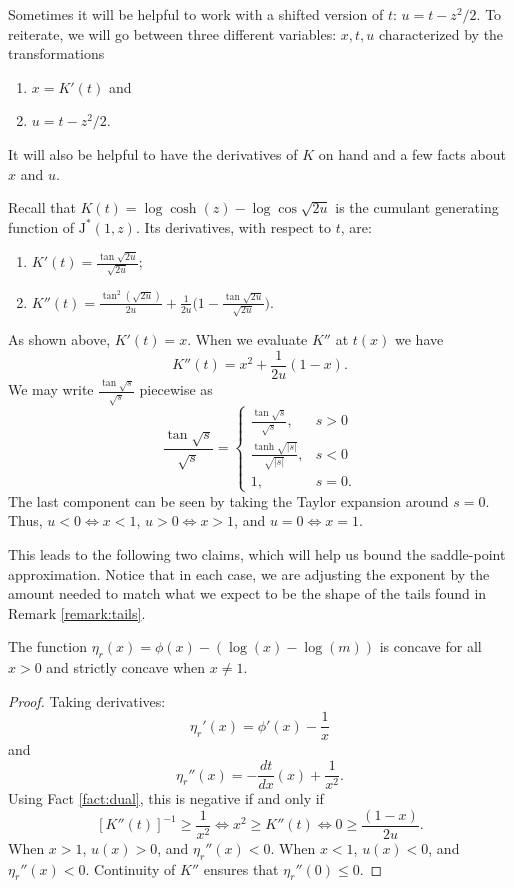 \documentclass[12pt]{article}
\newcommand{\JJ}{\text{J}^*}
\newcommand{\utanh}[1]{\frac{\tanh{\sqrt{#1}}}{\sqrt{#1}}}
\newcommand{\utan}[1]{\frac{\tan{\sqrt{#1}}}{\sqrt{#1}}}
\newcommand{\dd}[2]{\frac{d #1}{d #2}}
\begin{document}
Sometimes it will be helpful to work with a shifted version of $t$: \( u = t -
z^2/2.  \) To reiterate, we will go between three different variables: $x, t, u$
characterized by the transformations
\begin{enumerate}
\item $x = K'(t)$ and
\item $u = t - z^2 / 2$.
\end{enumerate}
It will also be helpful to have the derivatives of $K$ on hand and a few facts
about $x$ and $u$.
\begin{fact}
\label{fact:cgf-derivatives}
Recall that $K(t) = \log \cosh(z) - \log \cos \sqrt{2u}$ is the cumulant
generating function of $\JJ(1,z)$.  Its derivatives, with respect to $t$, are:
\begin{enumerate}
\item $\displaystyle K'(t) = \utan{2u}$;
\item $\displaystyle K''(t) = \frac{\tan^2(\sqrt{2u})}{2u} + \frac{1}{2u} \Big(1
  - \utan{2u} \Big)$.
\end{enumerate}
As shown above, $K'(t) = x$.  When we evaluate $K''$ at $t(x)$ we have
\[
K''(t) = x^2 + \frac{1}{2u} (1 - x).
\]
We may write $\utan{s}$ piecewise as
\[
\utan{s} = 
\begin{cases}
\utan{s}, & s > 0 \\
\utanh{|s|},  & s < 0 \\
1, & s = 0.
\end{cases}
\]
The last component can be seen by taking the Taylor expansion around $s=0$.
Thus, $u < 0 \iff x < 1$, $u> 0 \iff x > 1$, and $u=0 \iff x = 1$.
\end{fact}

This leads to the following two claims, which will help us bound the
saddle-point approximation.  Notice that in each case, we are adjusting the
exponent by the amount needed to match what we expect to be the shape of the
tails found in Remark \ref{remark:tails}.

\begin{lemma}
  The function $\eta_r(x) = \phi(x) - (\log(x) - \log(m))$ is concave
  for all $x > 0$ and strictly concave when $x \neq 1$.
\end{lemma}

\begin{proof}
Taking derivatives:
\[
\eta_r'(x) = \phi'(x) - \frac{1}{x}
\]
and
\[
\eta_r''(x) = - \dd{t}{x}(x) + \frac{1}{x^2}.
\]
Using Fact \ref{fact:dual}, this is negative if and only if
\[
[K''(t)]^{-1} \geq \frac{1}{x^2} \iff x^2 \geq K''(t) \iff 0 \geq \frac{(1-x)}{2u}.
\]
When $x > 1$, $u(x) > 0$, and $\eta_r''(x) < 0$.  When $x < 1$, $u(x) < 0$, and
$\eta_r''(x) < 0$.  Continuity of $K''$ ensures that $\eta_r''(0) \leq 0$.
\end{proof}
\end{document}

